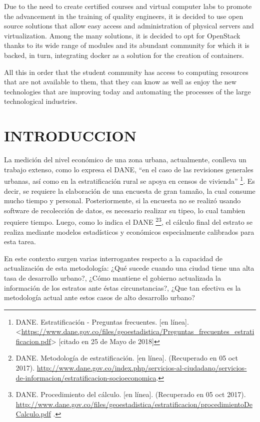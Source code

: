     Due to the need to create certified courses and virtual computer labs to promote the advancement in the training of quality engineers, it is decided to use open source solutions that allow easy access and administration of physical servers and virtualization. Among the many solutions, it is decided to opt for OpenStack thanks to its wide range of modules and its abundant community for which it is backed, in turn, integrating docker as a solution for the creation of containers.
    
    All this in order that the student community has access to computing resources that are not available to them, that they can know as well as enjoy the new technologies that are improving today and automating the processes of the large technological industries.
    
    
	\newpage\chapter*{INTRODUCCION}
    La medición del nivel económico de una zona urbana, actualmente, conlleva un trabajo extenso, como lo expresa el DANE, “en el caso de las revisiones generales urbanas, así como en la estratificación rural se apoya en censos de vivienda”    
    \footnote{DANE. Estratificación - Preguntas frecuentes. [en línea]. 
    		<\url{https://www.dane.gov.co/files/geoestadistica/Preguntas_frecuentes_estratificacion.pdf}> [citado en 25 de Mayo de 2018]}.
    Es decir, se requiere la elaboración de una encuesta de gran tamaño, la cual consume mucho tiempo y personal. Posteriormente, si la encuesta no se realizó usando software de recolección de datos, es necesario realizar su tipeo, lo cual tambien requiere tiempo. Luego, como lo indica el DANE
    \footnote{DANE. Metodología de estratificación. [en línea]. (Recuperado en 05 oct 2017). \url{http://www.dane.gov.co/index.php/servicios-al-ciudadano/servicios-de-informacion/estratificacion-socioeconomica}.}\footnote{DANE. Procedimiento del cálculo. [en línea]. (Recuperado en 05 oct 2017). \url{http://www.dane.gov.co/files/geoestadistica/estratificacion/procedimientoDeCalculo.pdf} .}, el cálculo final del estrato se realiza mediante modelos estadísticos y económicos especialmente calibrados para esta tarea.
    
    En este contexto surgen varias interrogantes respecto a la capacidad de actualización de esta metodología: ¿Qué sucede cuando una ciudad tiene una alta tasa de desarrollo urbano?, ¿Cómo mantiene el gobierno actualizada la información de los estratos ante éstas circunstancias?, ¿Que tan efectiva es la metodología actual ante estos casos de alto desarrollo urbano?
    

